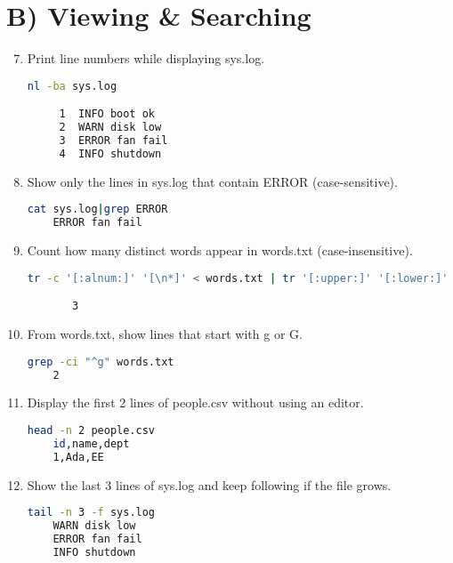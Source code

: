 \section*{B) Viewing \& Searching}
\begin{enumerate}
\setcounter{enumi}{6}
\item Print line numbers while displaying sys.log. \vspace{2em}\\
\begin{lstlisting}[language=sh]
nl -ba sys.log

     1	INFO boot ok
     2	WARN disk low
     3	ERROR fan fail
     4	INFO shutdown

\end{lstlisting}

\item Show only the lines in sys.log that contain ERROR (case-sensitive). \vspace{2em}\\
\begin{lstlisting}[language=sh]
cat sys.log|grep ERROR
    ERROR fan fail
\end{lstlisting}
\item Count how many distinct words appear in words.txt (case-insensitive). \vspace{2em}\\
\begin{lstlisting}[language=sh]
tr -c '[:alnum:]' '[\n*]' < words.txt | tr '[:upper:]' '[:lower:]' | sort | uniq | wc -l

       3

\end{lstlisting}
\item From words.txt, show lines that start with g or G. \vspace{2em}\\
\begin{lstlisting}[language=sh]
grep -ci "^g" words.txt 
    2
\end{lstlisting}
\item Display the first 2 lines of people.csv without using an editor. \vspace{2em}\\
\begin{lstlisting}[language=sh]
head -n 2 people.csv
    id,name,dept
    1,Ada,EE
\end{lstlisting}
\item Show the last 3 lines of sys.log and keep following if the file grows. \vspace{2em}\\
\begin{lstlisting}[language=sh]
tail -n 3 -f sys.log
    WARN disk low
    ERROR fan fail
    INFO shutdown



\end{lstlisting}
\end{enumerate}

